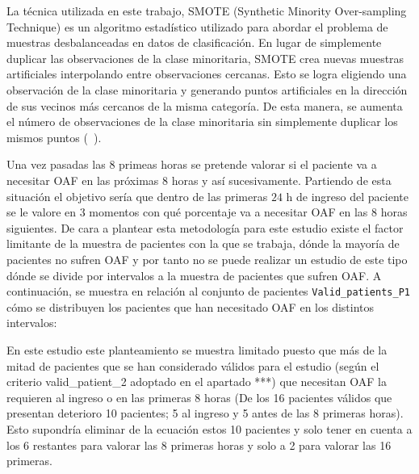 La técnica utilizada en este trabajo, SMOTE (Synthetic Minority Over-sampling Technique) es un algoritmo estadístico utilizado para abordar el problema de muestras desbalanceadas en datos de clasificación. En lugar de simplemente duplicar las observaciones de la clase minoritaria, SMOTE crea nuevas muestras artificiales interpolando entre observaciones cercanas. Esto se logra eligiendo una observación de la clase minoritaria y generando puntos artificiales en la dirección de sus vecinos más cercanos de la misma categoría. De esta manera, se aumenta el número de observaciones de la clase minoritaria sin simplemente duplicar los mismos puntos (~\cite{Chawla2002}).

















Una vez pasadas las $8$ primeas horas se pretende valorar si el paciente va a necesitar OAF en las próximas $8$ horas y así sucesivamente. Partiendo de esta situación el objetivo sería que dentro de las primeras $24$ h de ingreso del paciente se le valore en $3$ momentos con qué porcentaje va a necesitar OAF en las $8$ horas siguientes. De cara a plantear esta metodología para este estudio existe el factor limitante de la muestra de pacientes con la que se trabaja, dónde la mayoría de pacientes no sufren OAF y por tanto no se puede realizar un estudio de este tipo dónde se divide por intervalos a la muestra de pacientes que sufren OAF. A continuación, se muestra en relación al conjunto de pacientes \texttt{Valid\_patients\_P1} cómo se distribuyen los pacientes que han necesitado OAF en los distintos intervalos:

En este estudio este planteamiento se muestra limitado puesto que más de la mitad de pacientes que se han considerado válidos para el estudio (según el criterio valid\_patient\_2 adoptado en el apartado ***) que necesitan OAF la requieren al ingreso o en las primeras 8 horas (De los 16 pacientes válidos que presentan deterioro 10 pacientes; 5 al ingreso y 5 antes de las 8 primeras horas). Esto supondría eliminar de la ecuación estos 10 pacientes y solo tener en cuenta a los 6 restantes para valorar las 8 primeras horas y solo a 2 para valorar las 16 primeras.



